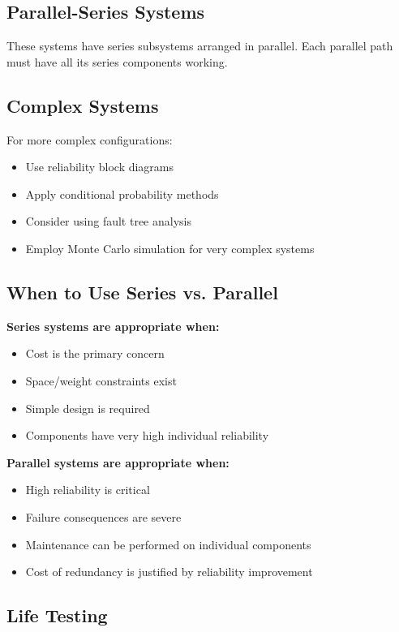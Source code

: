\documentclass[twoside]{book}
\begin{document}
\subsection{Parallel-Series Systems}

These systems have series subsystems arranged in parallel. Each parallel path must have all its series components working.

\subsection{Complex Systems}

For more complex configurations:
\begin{itemize}
    \item Use reliability block diagrams
    \item Apply conditional probability methods
    \item Consider using fault tree analysis
    \item Employ Monte Carlo simulation for very complex systems
\end{itemize}

\subsection{When to Use Series vs. Parallel}

\textbf{Series systems are appropriate when:}
\begin{itemize}
    \item Cost is the primary concern
    \item Space/weight constraints exist
    \item Simple design is required
    \item Components have very high individual reliability
\end{itemize}

\textbf{Parallel systems are appropriate when:}
\begin{itemize}
    \item High reliability is critical
    \item Failure consequences are severe
    \item Maintenance can be performed on individual components
    \item Cost of redundancy is justified by reliability improvement
\end{itemize}

\subsection{Life Testing}
\end{document}
